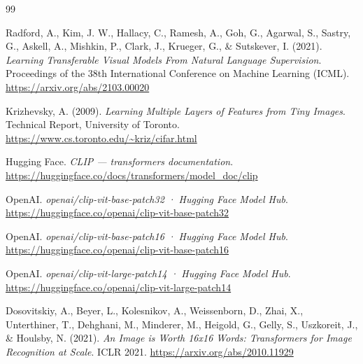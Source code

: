 \documentclass[12pt,a4paper]{ctexart}
\begin{document}
\begin{thebibliography}{99}

Radford, A., Kim, J. W., Hallacy, C., Ramesh, A., Goh, G., Agarwal, S., Sastry, G., Askell, A., Mishkin, P., Clark, J., Krueger, G., \& Sutskever, I. (2021).
\textit{Learning Transferable Visual Models From Natural Language Supervision}.
Proceedings of the 38th International Conference on Machine Learning (ICML).
\url{https://arxiv.org/abs/2103.00020}

Krizhevsky, A. (2009).
\textit{Learning Multiple Layers of Features from Tiny Images}.
Technical Report, University of Toronto.
\url{https://www.cs.toronto.edu/~kriz/cifar.html}

Hugging Face.
\textit{CLIP — transformers documentation}.
\url{https://huggingface.co/docs/transformers/model_doc/clip}

OpenAI.
\textit{openai/clip-vit-base-patch32 · Hugging Face Model Hub}.
\url{https://huggingface.co/openai/clip-vit-base-patch32}

OpenAI.
\textit{openai/clip-vit-base-patch16 · Hugging Face Model Hub}.
\url{https://huggingface.co/openai/clip-vit-base-patch16}

OpenAI.
\textit{openai/clip-vit-large-patch14 · Hugging Face Model Hub}.
\url{https://huggingface.co/openai/clip-vit-large-patch14}

Dosovitskiy, A., Beyer, L., Kolesnikov, A., Weissenborn, D., Zhai, X., Unterthiner, T., Dehghani, M., Minderer, M., Heigold, G., Gelly, S., Uszkoreit, J., \& Houlsby, N. (2021).
\textit{An Image is Worth 16x16 Words: Transformers for Image Recognition at Scale}.
ICLR 2021.
\url{https://arxiv.org/abs/2010.11929}

\end{thebibliography}
\end{document}
